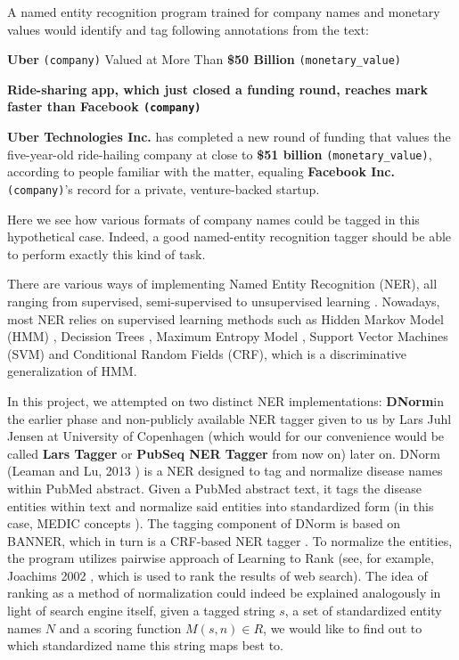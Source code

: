 A named entity recognition program trained for company names and monetary values would identify and tag following annotations from the text:

\begin{displayquote}
{\Large \textbf{Uber} \texttt{(company)} Valued at More Than  \textbf{\$50 Billion } \texttt{(monetary\_value)}}


\textbf{Ride-sharing app, which just closed a funding round, reaches mark faster than \textbf{Facebook} \texttt{(company)}}

\textbf{Uber Technologies Inc.} has completed a new round of funding that values the five-year-old ride-hailing company at close to \textbf{\$51 billion} \texttt{(monetary\_value)}, according to people familiar with the matter, equaling \textbf{Facebook Inc.} \texttt{(company)}’s record for a private, venture-backed startup.

\end{displayquote}

Here we see how various formats of company names could be tagged in this hypothetical case. Indeed, a good named-entity recognition tagger should be able to perform exactly this kind of task.

There are various ways of implementing Named Entity Recognition (NER), all ranging from supervised, semi-supervised to unsupervised learning \citep{nadeau2007survey}. Nowadays, most NER relies on supervised learning methods \citep{nadeau2007survey} such as Hidden Markov Model (HMM) \citep{bikel1997nymble}, Decission Trees \citep{sekine1998decision}, Maximum Entropy Model \citep{borthwick1998exploiting}, Support
Vector Machines (SVM) \citep{asahara2003japanese} and Conditional Random Fields (CRF)\citep{mccallum2003early}, which is a discriminative generalization of HMM\citep{lafferty2001conditional}.

In this project, we attempted on two distinct NER implementations: \textbf{DNorm}in the earlier phase and non-publicly available NER tagger given to us by Lars Juhl Jensen at University of Copenhagen (which would for our convenience would be called \textbf{Lars Tagger} or \textbf{PubSeq NER Tagger} from now on) later on. DNorm (Leaman and Lu, 2013 \citep{leaman2013dnorm}) is a NER designed to tag and normalize disease names within PubMed abstract. Given a PubMed abstract text, it tags the disease entities within text and normalize said entities into standardized form (in this case, MEDIC concepts \citep{davis2012medic}). The tagging component of DNorm is based on BANNER, which in turn is a CRF-based NER tagger \citep{leaman2008banner}. To normalize the entities, the program utilizes pairwise approach of Learning to Rank \citep{liu2009learning} (see, for example, Joachims 2002 \citep{joachims2002optimizing}, which is used to rank the results of web search). The idea of ranking as a method of normalization could indeed be explained analogously in light of search engine itself, given a tagged string $s$, a set of standardized entity names $N$ and a scoring function $M(s, n) \in R$, we would like to find out to which standardized name this string maps best to.

